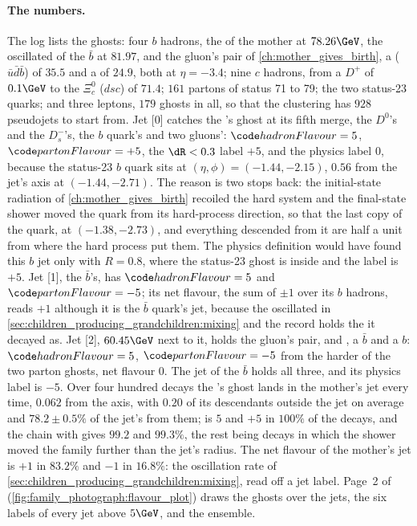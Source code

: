 \paragraph{The numbers.} The log lists the ghosts: four $b$ hadrons, the
\Bbar of the mother at $78.26\GeV$, the oscillated \Bbar of the $\bar b$
at $81.97$, and the gluon's pair of \cref{ch:mother_gives_birth}, a
\Lbbar ($\bar u\bar d\bar b$) of $35.5$ and a \Bbar of $24.9$, both at
$\eta=-3.4$; nine $c$ hadrons, from a $D^+$ of $0.1\GeV$ to the
$\Xi_c^0$ ($dsc$) of $71.4$; $161$ partons of status 71 to 79; the two
status-23 quarks; and three leptons, $179$ ghosts in all, so that the
\akfour clustering has $928$ pseudojets to start from. Jet [0] catches
the \Bbar's ghost at its fifth merge, the $D^0$'s and the $D_s^-$'s, the
$b$ quark's and two gluons': $\hadflav=5$, $\partflav=+5$, the $\dR<0.3$
label $+5$, and the physics label $0$, because the status-23 $b$ quark
sits at $(\eta,\phi)=(-1.44,-2.15)$, $0.56$ from the jet's axis at
$(-1.44,-2.71)$. The reason is two stops back: the initial-state
radiation of \cref{ch:mother_gives_birth} recoiled the hard system and
the final-state shower moved the quark from its hard-process direction,
so that the last copy of the quark, at $(-1.38,-2.73)$, and everything
descended from it are half a unit from where the hard process put them.
The physics definition would have found this $b$ jet only with $R=0.8$,
where the status-23 ghost is inside and the label is $+5$. Jet [1], the
$\bar b$'s, has $\hadflav=5$ and $\partflav=-5$; its net flavour, the
sum of $\pm1$ over its $b$ hadrons, reads $+1$ although it is the $\bar b$
quark's jet, because the \Bz oscillated in
\cref{sec:children_producing_grandchildren:mixing} and the record holds
the \Bbar it decayed as. Jet [2], $60.45\GeV$ next to it, holds the
gluon's pair, \Lbbar and \Bbar, a $\bar b$ and a $b$: $\hadflav=5$,
$\partflav=-5$ from the harder of the two parton ghosts, net flavour
$0$. The \akeight jet of the $\bar b$ holds all three, and its physics
label is $-5$. Over four hundred decays the \Bbar's ghost lands in the
mother's \akfour jet every time, $0.062$ from the axis, with $0.20$ of its
descendants outside the jet on average and $78.2\pm0.5\%$ of the jet's
\pt from them; \hadflav is $5$ and \partflav $+5$ in $100\%$ of the
decays, and the \PYTHIA chain with \FASTJET gives $99.2$ and $99.3\%$, the
rest being decays in which the shower moved the family further than the
jet's radius. The net flavour of the mother's jet is $+1$ in $83.2\%$ and
$-1$ in $16.8\%$: the oscillation rate of
\cref{sec:children_producing_grandchildren:mixing}, read off a jet label.
Page~2 of  (\cref{fig:family_photograph:flavour_plot})
draws the ghosts over the jets, the six labels of every jet above
$5\GeV$, and the ensemble.

